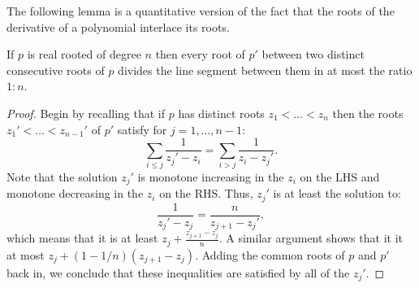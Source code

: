 The following lemma is a quantitative version of the fact that the roots of the derivative of a polynomial
interlace its roots.
\begin{lemma} \label{lem:aspect} If $p$ is real rooted of degree $n$ then
		every root of $p'$ between two distinct consecutive roots of
		$p$ divides the line segment between them in at most the ratio
		$1:n$. \end{lemma}
  \begin{proof} Begin by recalling that 
		if $p$ has distinct roots $z_1< \ldots < z_n$ then the
		roots $z_1' < \ldots < z_{n-1}'$ of $p'$ satisfy
		for $j=1,\ldots,n-1$:
		$$ \sum_{i\le j}\frac1{z_j'-z_i} = \sum_{i>j}\frac1{z_i-z_j'}.$$
		Note that the solution $z_j'$ is monotone increasing in the
		$z_i$ on the LHS and monotone decreasing in the $z_i$ on the
		RHS. Thus, $z_j'$ is at least the solution to:
		$$ \frac1{z_j'-z_j}=\frac{n}{z_{j+1}-z_j'},$$
		which means that it is at least $z_j+\frac{z_{j+1}-z_j}{n}$. A
		similar argument shows that it it at most
		$z_j+(1-1/n)(z_{j+1}-z_j)$. Adding the common roots of $p$ and
		$p'$ back in, we conclude that these inequalities are satisfied
		by all of the $z_j'$.\end{proof}
